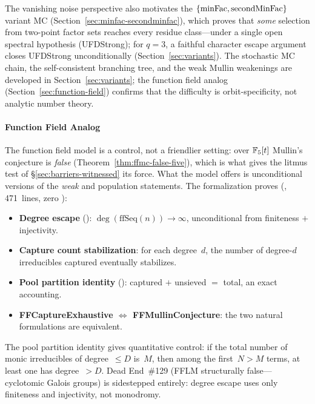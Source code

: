 The vanishing noise perspective also motivates the
$\{\mathrm{minFac}, \operatorname{secondMinFac}\}$ variant MC
(Section~\ref{sec:minfac-secondminfac}), which proves that
\emph{some} selection from two-point factor sets reaches every
residue class---under a single open spectral hypothesis
(UFDStrong); for $q = 3$, a faithful character escape argument
closes UFDStrong unconditionally (Section~\ref{sec:variants}).
The stochastic MC chain, the self-consistent branching tree,
and the weak Mullin weakenings are developed in
Section~\ref{sec:variants}; the function field analog
(Section~\ref{sec:function-field}) confirms that the difficulty is
orbit-specificity, not analytic number theory.


\paragraph{Function Field Analog}

The function field model is a control, not a friendlier setting: over
$\mathbb{F}_5[t]$ Mullin's conjecture is \emph{false}
(Theorem~\ref{thm:ffmc-false-five}), which is what gives the litmus test
of \S\ref{sec:barriers-witnessed} its force.  What the model offers is
unconditional versions of the \emph{weak} and population statements.
The formalization proves
(, 471~lines, zero ):
\begin{itemize}[nosep]
\item \textbf{Degree escape}
():
$\deg(\mathrm{ffSeq}(n)) \to \infty$, unconditional from finiteness
$+$ injectivity.
\item \textbf{Capture count stabilization}: for each degree~$d$, the
number of degree-$d$ irreducibles captured eventually stabilizes.
\item \textbf{Pool partition identity}
():
captured $+$ unsieved $=$ total, an exact accounting.
\item \textbf{FFCaptureExhaustive $\Leftrightarrow$ FFMullinConjecture}:
the two natural formulations are equivalent.
\end{itemize}
The pool partition identity gives quantitative control:
if the total number of monic irreducibles of degree~$\leq D$ is~$M$,
then among the first~$N > M$ terms, at least one has degree~$> D$.
Dead End~\#129 (FFLM structurally false---cyclotomic Galois groups)
is sidestepped entirely: degree escape uses only finiteness and
injectivity, not monodromy.


